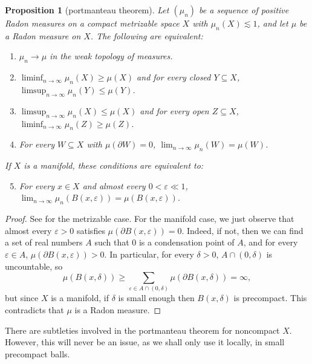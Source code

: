 \documentclass[final,12pt, leqno]{brownthesis}
\newtheorem{proposition}[theorem]{Proposition}
\theoremstyle{definition}
\numberwithin{equation}{section}
\begin{document}
\begin{proposition}[portmanteau theorem]
	Let $(\mu_n)$ be a sequence of positive Radon measures on a compact metrizable space $X$ with $\mu_n(X) \lesssim 1$, and let $\mu$ be a Radon measure on $X$. The following are equivalent:
\begin{enumerate}
	\item $\mu_n \to \mu$ in the weak topology of measures.
	\item $\liminf_{n \to \infty} \mu_n(X) \geq \mu(X)$ and for every closed $Y \subseteq X$, $\limsup_{n \to \infty} \mu_n(Y) \leq \mu(Y)$.
	\item $\limsup_{n \to \infty} \mu_n(X) \leq \mu(X)$ and for every open $Z \subseteq X$, $\liminf_{n \to \infty} \mu_n(Z) \geq \mu(Z)$.
	\item For every $W \subseteq X$ with $\mu(\partial W) = 0$, $\lim_{n \to \infty} \mu_n(W) = \mu(W)$.
\end{enumerate}
	If $X$ is a manifold, these conditions are equivalent to:
\begin{enumerate}
	\setcounter{enumi}{4}
	\item For every $x \in X$ and almost every $0 < \varepsilon \ll 1$, $\lim_{n \to \infty} \mu_n(B(x, \varepsilon)) = \mu(B(x, \varepsilon))$.
\end{enumerate}
\end{proposition}
\begin{proof}
	See \cite[Theorem 13.16]{klenke2013probability} for the metrizable case.
	For the manifold case, we just observe that almost every $\varepsilon > 0$ satisfies $\mu(\partial B(x, \varepsilon)) = 0$. Indeed, if not, then we can find a set of real numbers $A$ such that $0$ is a condensation point of $A$, and for every $\varepsilon \in A$, $\mu(\partial B(x, \varepsilon)) > 0$.
	In particular, for every $\delta > 0$, $A \cap (0, \delta)$ is uncountable, so
	$$\mu(B(x, \delta)) \geq \sum_{\varepsilon \in A \cap (0, \delta)} \mu(\partial B(x, \delta)) = \infty,$$
	but since $X$ is a manifold, if $\delta$ is small enough then $B(x, \delta)$ is precompact.
	This contradicts that $\mu$ is a Radon measure.
\end{proof}

There are subtleties involved in the portmanteau theorem for noncompact $X$.
However, this will never be an issue, as we shall only use it locally, in small precompact balls.
\end{document}
